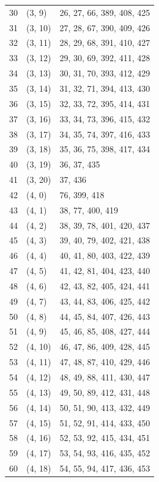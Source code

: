 \documentclass{article}
\begin{document}
\begin{longtable}{lll}
  30 & (3, 9) & 26, 27, 66, 389, 408, 425 \\
  31 & (3, 10) & 27, 28, 67, 390, 409, 426 \\
  32 & (3, 11) & 28, 29, 68, 391, 410, 427 \\
  33 & (3, 12) & 29, 30, 69, 392, 411, 428 \\
  34 & (3, 13) & 30, 31, 70, 393, 412, 429 \\
  35 & (3, 14) & 31, 32, 71, 394, 413, 430 \\
  36 & (3, 15) & 32, 33, 72, 395, 414, 431 \\
  37 & (3, 16) & 33, 34, 73, 396, 415, 432 \\
  38 & (3, 17) & 34, 35, 74, 397, 416, 433 \\
  39 & (3, 18) & 35, 36, 75, 398, 417, 434 \\
  40 & (3, 19) & 36, 37, 435 \\
  41 & (3, 20) & 37, 436 \\
  42 & (4, 0) & 76, 399, 418 \\
  43 & (4, 1) & 38, 77, 400, 419 \\
  44 & (4, 2) & 38, 39, 78, 401, 420, 437 \\
  45 & (4, 3) & 39, 40, 79, 402, 421, 438 \\
  46 & (4, 4) & 40, 41, 80, 403, 422, 439 \\
  47 & (4, 5) & 41, 42, 81, 404, 423, 440 \\
  48 & (4, 6) & 42, 43, 82, 405, 424, 441 \\
  49 & (4, 7) & 43, 44, 83, 406, 425, 442 \\
  50 & (4, 8) & 44, 45, 84, 407, 426, 443 \\
  51 & (4, 9) & 45, 46, 85, 408, 427, 444 \\
  52 & (4, 10) & 46, 47, 86, 409, 428, 445 \\
  53 & (4, 11) & 47, 48, 87, 410, 429, 446 \\
  54 & (4, 12) & 48, 49, 88, 411, 430, 447 \\
  55 & (4, 13) & 49, 50, 89, 412, 431, 448 \\
  56 & (4, 14) & 50, 51, 90, 413, 432, 449 \\
  57 & (4, 15) & 51, 52, 91, 414, 433, 450 \\
  58 & (4, 16) & 52, 53, 92, 415, 434, 451 \\
  59 & (4, 17) & 53, 54, 93, 416, 435, 452 \\
  60 & (4, 18) & 54, 55, 94, 417, 436, 453 \\

\end{longtable}
\end{document}
